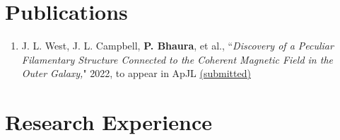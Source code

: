 \documentclass[10pt]{res} %
\begin{document}
\begin{resume}

\section{\Large Publications}
\vspace{-5pt} %
\noindent\makebox[\linewidth]{\rule{\textwidth}{0.4pt}}
\vspace{-10pt} %
\begin{enumerate}[{start=1,label=\arabic*.\addtocounter{enumi}{-2}}]
\itemsep-1em 
	\item J. L. West, J. L. Campbell, \textbf{P. Bhaura}, et al., ``\textit{Discovery of a Peculiar Filamentary Structure Connected to the Coherent Magnetic Field in the Outer Galaxy,}" 2022, to appear in ApJL \href{https://ui.adsabs.harvard.edu/abs/2022arXiv221010098W/abstract}{(submitted)}
\end{enumerate}



\section{\Large Research Experience}
\vspace{-5pt} %
\noindent\makebox[\linewidth]{\rule{\textwidth}{0.4pt}}
\vspace{-20pt} %


\end{resume}
\end{document}
